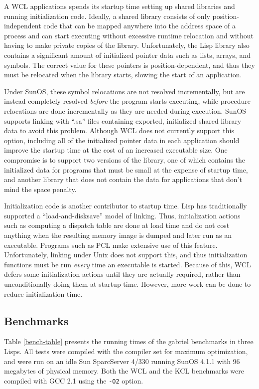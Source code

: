A WCL applications spends its startup time setting up shared
libraries and running initialization code.  Ideally, a shared library
consists of only position-independent code that can be mapped anywhere
into the address space of a process and can start executing without
excessive runtime relocation and without having to make private copies
of the library. Unfortunately, the Lisp library also contains a
significant amount of initialized pointer data such as lists, arrays, and
symbols. The correct value for these pointers is position-dependent,
and thus they must be relocated when the library starts, slowing the
start of an application.

Under SunOS, these symbol relocations are not resolved incrementally,
but are instead completely resolved {\it before} the program starts
executing, while procedure relocations are done incrementally as they
are needed during execution.  SunOS supports linking with ``.sa''
files containing exported, initialized shared library data to avoid
this problem.  Although WCL does not currently support this option,
including all of the initialized pointer data in each application
should improve the startup time at the cost of an increased executable
size.  One compromise is to support two versions of the library, one
of which contains the initialized data for programs that must be small
at the expense of startup time, and another library that does not
contain the data for applications that don't mind the space penalty.

Initialization code is another contributor to startup time.  Lisp has
traditionally supported a ``load-and-disksave'' model of linking.
Thus, initialization actions such as computing a dispatch table are
done at load time and do not cost anything when the resulting memory
image is dumped and later run as an executable.  Programs such as PCL
make extensive use of this feature.  Unfortunately, 
linking under Unix does not support this, and thus initialization
functions must be run {\it every} time an executable is started.
Because of this, WCL defers some initialization actions until they are
actually required, rather than unconditionally doing them at startup
time. However, more work can be done to reduce initialization time.

\subsection{Benchmarks}

Table \ref{bench-table} presents the running times of the gabriel
benchmarks in three Lisps. All tests were compiled with the compiler
set for maximum optimization, and were run on an idle Sun SparcServer
4/330 running SunOS 4.1.1 with 96 megabytes of physical memory.  
Both the WCL and the KCL benchmarks were compiled with GCC 2.1 using the
{\tt -O2} option.

